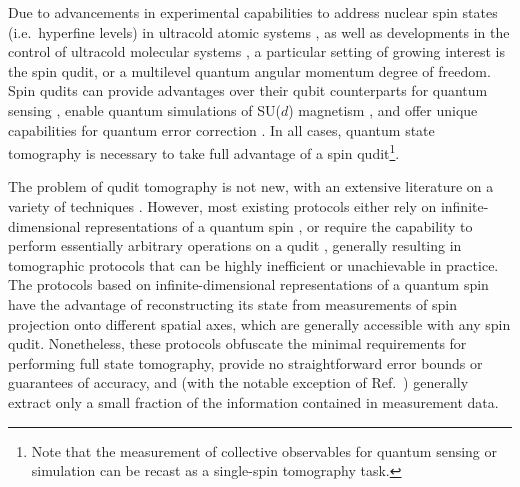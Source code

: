 \documentclass[nofootinbib,twocolumn]{revtex4-1}
\begin{document}
Due to advancements in experimental capabilities to address nuclear spin states (i.e.~hyperfine levels) in ultracold atomic systems \cite{daley2011quantum, lu2011strongly, mischuck2012control, aikawa2012boseeinstein, smith2013quantum, cazalilla2014ultracold}, as well as developments in the control of ultracold molecular systems \cite{bohn2017cold, takekoshi2014ultracold, zeppenfeld2012sisyphus, kozyryev2017sisyphus, puri2017synthesis, wu2017cryofuge, marco2019degenerate, liu2019molecular, anderegg2019optical, chou2020frequencycomb, lin2020quantum}, a particular setting of growing interest is the spin qudit, or a multilevel quantum angular momentum degree of freedom.  Spin qudits can provide advantages over their qubit counterparts for quantum sensing \cite{hemmer2018squeezing, evrard2019enhanced}, enable quantum simulations of SU($d$) magnetism \cite{cazalilla2014ultracold, banerjee2013atomic, zhang2014spectroscopic, scazza2014observation, goban2018emergence}, %
and offer unique capabilities for quantum error correction \cite{albert2020robust, gross2021designing}.
In all cases, quantum state tomography is necessary to take full advantage of a spin qudit\footnote{Note that the measurement of collective observables for quantum sensing or simulation can be recast as a single-spin tomography task.}.

The problem of qudit tomography is not new, with an extensive literature on a variety of techniques \cite{newton1968measurability, hofmann2004quantumstate, filippov2010inverse, schmied2011tomographic, evrard2019enhanced, flammia2005minimal, thew2002qudit, salazar2012quantum, sosa-martinez2017quantum, ha2018minimal, stefano2019set, palici2020oam}.
However, most existing protocols either rely on infinite-dimensional representations of a quantum spin \cite{manko1997spin, schmied2011tomographic, evrard2019enhanced}, or require the capability to perform essentially arbitrary operations on a qudit \cite{thew2002qudit, flammia2005minimal, salazar2012quantum, sosa-martinez2017quantum, ha2018minimal, stefano2019set, palici2020oam}, generally resulting in tomographic protocols that can be highly inefficient or unachievable in practice.
The protocols based on infinite-dimensional representations of a quantum spin have the advantage of reconstructing its state from measurements of spin projection onto different spatial axes, which are generally accessible with any spin qudit.
Nonetheless, these protocols obfuscate the minimal requirements for performing full state tomography, provide no straightforward error bounds or guarantees of accuracy, and (with the notable exception of Ref.~\cite{schmied2011tomographic}) generally extract only a small fraction of the information contained in measurement data.
\end{document}
